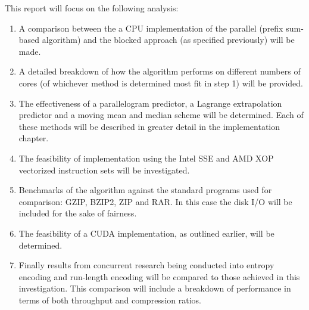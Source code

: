 This report will focus on the following analysis:
\begin{enumerate}
 \item A comparison between the a CPU implementation of the parallel (prefix sum-based algorithm) and the blocked approach (as specified previously) will be made.
 \item A detailed breakdown of how the algorithm performs on different numbers of cores (of whichever method is determined most fit in step 1) will be provided.
 \item The effectiveness of a parallelogram predictor, a Lagrange extrapolation predictor \cite{engelson2000lossless} and a moving mean and median scheme will be determined. 
       Each of these methods will be described in greater detail in the implementation chapter.
 \item The feasibility of implementation using the Intel SSE and AMD XOP vectorized instruction sets will be investigated.
 \item Benchmarks of the algorithm against the standard programs used for comparison: GZIP, BZIP2, ZIP and RAR. In this case the disk I/O will be included for the sake of fairness.
 \item The feasibility of a CUDA implementation, as outlined earlier, will be determined.
 \item Finally results from concurrent research being conducted into entropy encoding and run-length encoding will be compared to those achieved in this investigation. This comparison will include a 
       breakdown of performance in terms of both throughput and compression ratios.
\end{enumerate}
